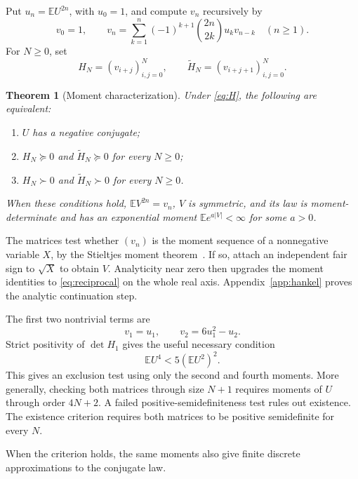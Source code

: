 \documentclass[11pt,twoside]{article}
\theoremstyle{journalplain}
\numberwithin{equation}{section}
\newtheorem{theorem}{Theorem}[section]
\theoremstyle{journaldefinition}
\newcommand{\E}{\mathbb E}
\begin{document}
Put $u_n=\E U^{2n}$, with $u_0=1$, and compute $v_n$ recursively by
\begin{equation}\label{eq:recursion}
 v_0=1,\qquad
 v_n=\sum_{k=1}^n(-1)^{k+1}\binom{2n}{2k}u_kv_{n-k}
 \quad(n\ge1).
\end{equation}
For $N\ge0$, set
\begin{equation}\label{eq:hankel}
 H_N=(v_{i+j})_{i,j=0}^N,\qquad
 \widetilde H_N=(v_{i+j+1})_{i,j=0}^N.
\end{equation}
\begin{theorem}[Moment characterization]\label{thm:hankel}
Under \eqref{eq:H}, the following are equivalent:
\begin{enumerate}[label=(\alph*)]
\item $U$ has a negative conjugate;
\item $H_N\succeq0$ and $\widetilde H_N\succeq0$ for every $N\ge0$;
\item $H_N\succ0$ and $\widetilde H_N\succ0$ for every $N\ge0$.
\end{enumerate}
When these conditions hold, $\E V^{2n}=v_n$, $V$ is symmetric, and its law is moment-determinate and has an exponential moment $\E e^{a|V|}<\infty$ for some $a>0$.
\end{theorem}
The matrices test whether $(v_n)$ is the moment sequence of a nonnegative variable $X$, by the Stieltjes moment theorem\ \cite[Chapters 3--5]{Schmudgen2017}. If so, attach an independent fair sign to $\sqrt X$ to obtain $V$. Analyticity near zero then upgrades the moment identities to \eqref{eq:reciprocal} on the whole real axis. Appendix~\ref{app:hankel} proves the analytic continuation step.

The first two nontrivial terms are
\[
 v_1=u_1,\qquad v_2=6u_1^2-u_2.
\]
Strict positivity of $\det H_1$ gives the useful necessary condition
\begin{equation}\label{eq:fourth}
 \E U^4<5(\E U^2)^2.
\end{equation}
This gives an exclusion test using only the second and fourth moments. More generally, checking both matrices through size $N+1$ requires moments of $U$ through order $4N+2$. A failed positive-semidefiniteness test rules out existence. The existence criterion requires both matrices to be positive semidefinite for every $N$.

When the criterion holds, the same moments also give finite discrete approximations to the conjugate law.
\end{document}
